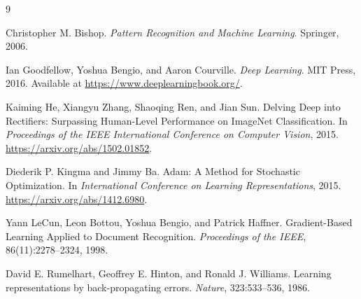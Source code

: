 \documentclass[11pt]{article}
\begin{document}
\begin{thebibliography}{9}

Christopher M. Bishop.
\newblock \emph{Pattern Recognition and Machine Learning}.
\newblock Springer, 2006.

Ian Goodfellow, Yoshua Bengio, and Aaron Courville.
\newblock \emph{Deep Learning}.
\newblock MIT Press, 2016.
\newblock Available at \url{https://www.deeplearningbook.org/}.

Kaiming He, Xiangyu Zhang, Shaoqing Ren, and Jian Sun.
\newblock Delving Deep into Rectifiers: Surpassing Human-Level Performance on
ImageNet Classification.
\newblock In \emph{Proceedings of the IEEE International Conference on Computer
Vision}, 2015.
\newblock \url{https://arxiv.org/abs/1502.01852}.


Diederik P. Kingma and Jimmy Ba.
\newblock Adam: A Method for Stochastic Optimization.
\newblock In \emph{International Conference on Learning Representations}, 2015.
\newblock \url{https://arxiv.org/abs/1412.6980}.

Yann LeCun, Leon Bottou, Yoshua Bengio, and Patrick Haffner.
\newblock Gradient-Based Learning Applied to Document Recognition.
\newblock \emph{Proceedings of the IEEE}, 86(11):2278--2324, 1998.

David E. Rumelhart, Geoffrey E. Hinton, and Ronald J. Williams.
\newblock Learning representations by back-propagating errors.
\newblock \emph{Nature}, 323:533--536, 1986.

\end{thebibliography}
\end{document}
